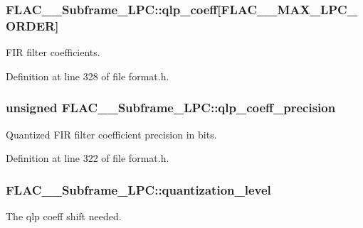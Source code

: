 \subsubsection[{\texorpdfstring{qlp\+\_\+coeff}{qlp_coeff}}]{ F\+L\+A\+C\+\_\+\+\_\+\+Subframe\+\_\+\+L\+P\+C\+::qlp\+\_\+coeff\mbox{[}{\bf F\+L\+A\+C\+\_\+\+\_\+\+M\+A\+X\+\_\+\+L\+P\+C\+\_\+\+O\+R\+D\+ER}\mbox{]}}\hypertarget{struct_f_l_a_c_____subframe___l_p_c_ad0b37ee925e2124a37fe3a513d5410b8}{}\label{struct_f_l_a_c_____subframe___l_p_c_ad0b37ee925e2124a37fe3a513d5410b8}
F\+IR filter coefficients. 

Definition at line 328 of file format.\+h.

\subsubsection[{\texorpdfstring{qlp\+\_\+coeff\+\_\+precision}{qlp_coeff_precision}}]{\setlength{\rightskip}{0pt plus 5cm}unsigned F\+L\+A\+C\+\_\+\+\_\+\+Subframe\+\_\+\+L\+P\+C\+::qlp\+\_\+coeff\+\_\+precision}\hypertarget{struct_f_l_a_c_____subframe___l_p_c_a6123b031203f603eba966b95fd2ad855}{}\label{struct_f_l_a_c_____subframe___l_p_c_a6123b031203f603eba966b95fd2ad855}
Quantized F\+IR filter coefficient precision in bits. 

Definition at line 322 of file format.\+h.

\subsubsection[{\texorpdfstring{quantization\+\_\+level}{quantization_level}}]{ F\+L\+A\+C\+\_\+\+\_\+\+Subframe\+\_\+\+L\+P\+C\+::quantization\+\_\+level}\hypertarget{struct_f_l_a_c_____subframe___l_p_c_aedcf1a3e5e62485e7ce250eda1f3e588}{}\label{struct_f_l_a_c_____subframe___l_p_c_aedcf1a3e5e62485e7ce250eda1f3e588}
The qlp coeff shift needed. 

